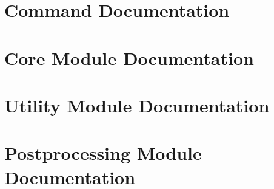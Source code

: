 \documentclass{book}
\begin{document}
\appendix
\chapter[Commands]{Command Documentation}\label{commands}



\chapter[Modules]{Core Module Documentation}\label{coremodules}
























\chapter[Utility Modules]{Utility Module Documentation}\label{utilitymodules}


\chapter[Postprocessing Modules]{Postprocessing Module Documentation}\label{postmodules}

\end{document}
